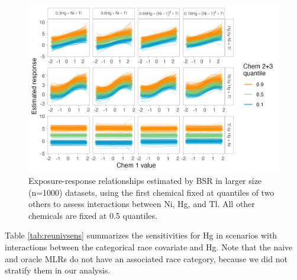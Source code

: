 \documentclass[12pt, twoside]{amherstthesis}
\begin{document}
\begin{figure}

{\centering \includegraphics[width=0.8\linewidth]{figures/ch4_slg_triv_expresp} 

}

\caption{Exposure-response relationships estimated by BSR in larger size (n=1000) datasets, using the first chemical fixed at quantiles of two others to assess interactions between Ni, Hg, and Tl. All other chemicals are fixed at 0.5 quantiles.}\label{fig:slgtri}
\end{figure}
Table \ref{tab:reunivsens} summarizes the sensitivities for Hg in scenarios with interactions between the categorical race covariate and Hg. Note that the naive and oracle MLRs do not have an associated race category, because we did not stratify them in our analysis.
\end{document}

